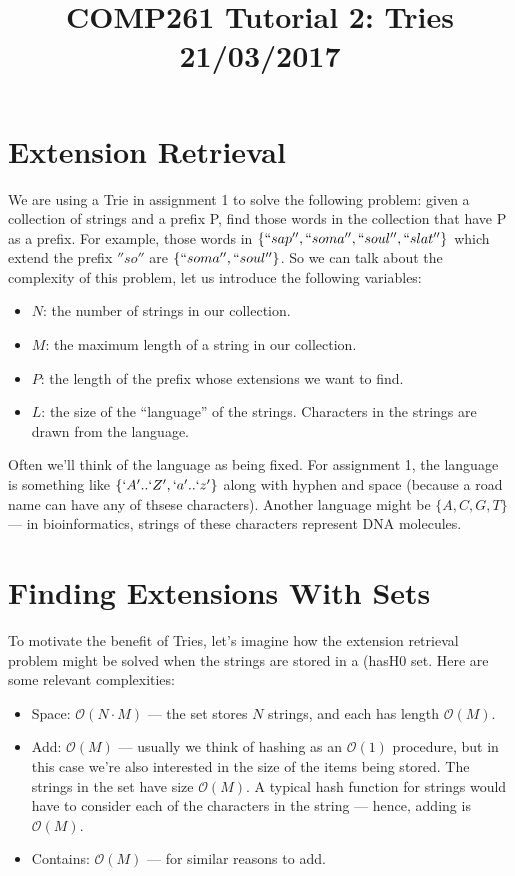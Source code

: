 \documentclass[a4paper,12pt]{article}
\begin{document}
\title{COMP261 Tutorial 2: Tries \\ 21/03/2017}
\date{}
\maketitle

\section{Extension Retrieval}

We are using a Trie in assignment 1 to solve the following problem: given a collection of strings and a prefix P, find those words in the collection that have P as a prefix. For example, those words in $\{ ``sap'', ``soma'', ``soul'', ``slat'' \}$ which extend the prefix $''so''$ are $\{ ``soma'', ``soul''\}$. So we can talk about the complexity of this problem, let us introduce the following variables:

\begin{itemize}
	\item $N$: the number of strings in our collection.
	\item $M$: the maximum length of a string in our collection.
	\item $P$: the length of the prefix whose extensions we want to find.
	\item $L$: the size of the ``language'' of the strings. Characters in the strings are drawn from the language.
\end{itemize}

\noindent
Often we'll think of the language as being fixed. For assignment 1, the language is something like $\{ `A' .. `Z', `a' .. `z' \}$ along with hyphen and space (because a road name can have any of thsese characters). Another language might be $\{ A, C, G, T\}$ --- in bioinformatics, strings of these characters represent DNA molecules.

\section{Finding Extensions With Sets}

To motivate the benefit of Tries, let's imagine how the extension retrieval problem might be solved when the strings are stored in a (hasH0 set. Here are some relevant complexities:

\begin{itemize}
	\item Space: $\mathcal{O}(N \cdot M)$ --- the set stores $N$ strings, and each has length $\mathcal{O}(M)$.
	\item Add: $\mathcal{O}(M)$ --- usually we think of hashing as an $\mathcal{O}(1)$ procedure, but in this case we're also interested in the size of the items being stored. The strings in the set have size $\mathcal{O}(M)$. A typical hash function for strings would have to consider each of the characters in the string --- hence, adding is $\mathcal{O}(M)$. 
	\item Contains: $\mathcal{O}(M)$ --- for similar reasons to add.
\end{itemize}
\end{document}
